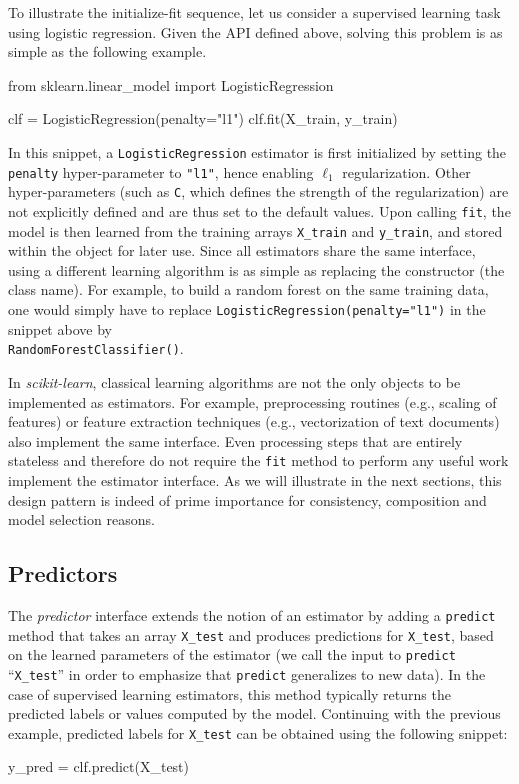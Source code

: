 \documentclass{llncs}
\newcommand{\sklearn}{\textit{scikit-learn}\xspace}
\begin{document}
To illustrate the initialize-fit sequence,
let us consider a supervised learning task using logistic regression.
Given the API defined above, solving this problem is as simple as the following
example.
\begin{pythoncode}
from sklearn.linear_model import LogisticRegression

clf = LogisticRegression(penalty="l1")
clf.fit(X_train, y_train)
\end{pythoncode}
In this snippet, a \texttt{LogisticRegression} estimator is first initialized by
setting the \texttt{penalty} hyper-parameter to \texttt{"l1"}, hence enabling
$\ell_1$ regularization. Other hyper-parameters (such as \texttt{C}, which
defines the strength of the regularization) are not explicitly defined and are
thus set to the default values. Upon calling \texttt{fit}, the model is then
learned from the training arrays \texttt{X\_train} and \texttt{y\_train},
and stored within the object for later use.
Since all estimators share the same interface, using a different learning algorithm is
as simple as replacing the constructor (the class name).
For example, to build a random forest on
the same training data, one would simply have to replace
\texttt{LogisticRegression(penalty="l1")} in the snippet above by \\
\texttt{RandomForestClassifier()}.

In \sklearn, classical learning algorithms are not the only objects to be
implemented as estimators. For example, preprocessing routines (e.g., scaling of
features) or feature extraction techniques (e.g., vectorization of text
documents) also implement the same interface. Even processing steps that are
entirely stateless and therefore do not require the \texttt{fit} method to
perform any useful work implement the estimator interface. As we will illustrate
in the next sections, this design pattern is indeed of prime importance for
consistency, composition and model selection reasons.

\subsection{Predictors}

The \textit{predictor} interface extends the notion of an estimator
by adding a \texttt{predict}
method that takes an array \texttt{X\_test} and produces
predictions for \texttt{X\_test}, based on the learned parameters of the
estimator (we call the input to \texttt{predict} ``\texttt{X\_test}'' in order
to emphasize that \texttt{predict} generalizes to new data). In the case of
supervised learning estimators, this method typically returns the predicted
labels or values computed by the model.  Continuing with the previous example,
predicted labels for \texttt{X\_test} can be obtained using the following
snippet:
\begin{pythoncode}
y_pred = clf.predict(X_test)
\end{pythoncode}
\end{document}
